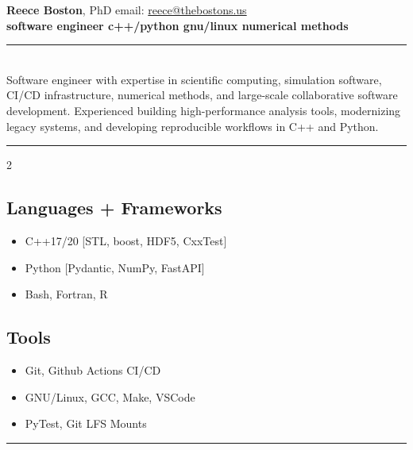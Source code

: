 \documentclass[11pt]{article}
\newcommand{\vl}{\textbullet\xspace}
\begin{document}
 \noindent %
 {\large  {\bf Reece Boston}, PhD} \hfill {email: \href{mailto:Reece@thebostons.us}{reece@thebostons.us}}\\
 {\bf \small
 	software engineer \vl 
	c++/python \vl 
  gnu/linux \vl
	numerical methods
 }
 \hfill
 \href{https://github.com/rboston628}{}
 \href{https://orcid.org/0000-0001-8122-1961}{}
\\
\hrule\null\\
 {\small 
	Software engineer with expertise in scientific computing, simulation software, 
	CI/CD infrastructure, numerical methods, and large-scale collaborative software development. 
	Experienced building high-performance analysis tools, modernizing legacy systems, and developing 
	reproducible workflows in C++ and Python.
 }\\

\hrule
\vspace{-0.5\baselineskip}
\begin{multicols}{2}
\subsection*{Languages + Frameworks}
\begin{itemize}
	\item C++17/20 [STL, boost, HDF5, CxxTest]
	\item Python [Pydantic, NumPy, FastAPI]
	\item Bash, Fortran, R
\end{itemize}
\columnbreak
\subsection*{Tools \hfill \drawcalculator}
\begin{itemize}
\item Git, Github Actions CI/CD
\item GNU/Linux, GCC, Make, VSCode
\item PyTest, Git LFS Mounts
\end{itemize}
\end{multicols}
\hrule
\end{document}
